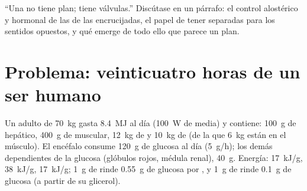 \begin{exercise}[$\star\star\star$]\label{exo:b1:biosyntheses-integration:12}
``Una  no tiene plan; tiene válvulas.'' Discútase en un párrafo: el
control alostérico y hormonal de las  de las encrucijadas, el papel
de tener  separadas para los sentidos opuestos, y qué emerge de todo
ello que parece un plan.
\end{exercise}

\section{Problema: veinticuatro horas de un ser humano}

\begin{problem}
\label{pb:b1:biosyntheses-integration:1}
Un adulto de \qty{70}{kg} gasta \qty{8.4}{MJ} al día (\qty{100}{W} de
media) y contiene: \qty{100}{g} de  hepático, \qty{400}{g} de
 muscular, \qty{12}{kg} de  y \qty{10}{kg} de  (de la
que \qty{6}{kg} están en el músculo). El encéfalo consume \qty{120}{g} de
glucosa al día (\qty{5}{g/h}); los demás  dependientes de la glucosa
(glóbulos rojos, médula renal), \qty{40}{g}. Energía: 
\qty{17}{kJ/g},  \qty{38}{kJ/g},  \qty{17}{kJ/g}; \qty{1}{g} de
 rinde \qty{0.55}{g} de glucosa por , y \qty{1}{g} de
 rinde \qty{0.1}{g} de glucosa (a partir de su glicerol).


\end{problem}
